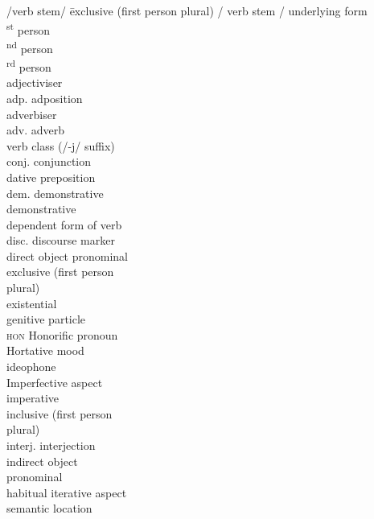 
\begin{multicols}{2} 
\setlength{\parindent}{0pt}
\begin{tabbing}
	\slash verb stem\slash \hspace{1em} \= exclusive (first person plural)\hspace{1em}\kill
	/ verb stem / \> underlying form\\
	 \textsuperscript{st} person\\
	 \textsuperscript{nd} person\\
	 \textsuperscript{rd} person \\
	\ADJ \> adjectiviser\\
	adp. \> adposition \\
	\ADV \> adverbiser\\
	adv. \> adverb\\
	\CL \> verb class (/-j/ suffix)\\
	conj. \> conjunction\\
	\DAT \> dative preposition\\
	dem.\> demonstrative\\
	\DEM\> demonstrative\\
	\DEP \> dependent form of verb\\
	disc. \> discourse marker \\
	\DO \> direct object pronominal\\
	\EX \> exclusive (first person\\\> plural)\\
	\EXT \> existential\\
	\GEN \> genitive particle\\
    \textsc{hon} \> Honorific pronoun\\
	\HOR \> Hortative mood \\
	\ID \> ideophone\\
	\IFV \> Imperfective aspect\\
	\IMP \> imperative\\
	\IN \> inclusive (first person \\\>plural)\\
	interj. \> interjection \\
	\IO \> indirect object \\ \> pronominal \\
	\ITR \> habitual iterative aspect\\
	\LOC \> semantic location\\

\end{tabbing}
\end{multicols}
